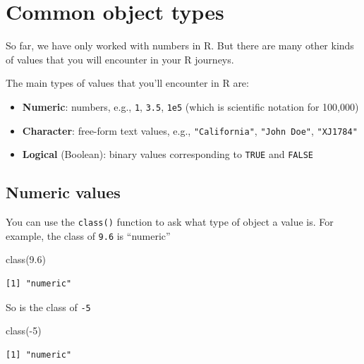 \documentclass[
  letterpaper,
  DIV=11,
  numbers=noendperiod]{scrreprt}
\newenvironment{Shaded}{\begin{snugshade}}{\end{snugshade}}
\newcommand{\DecValTok}[1]{\textcolor[rgb]{0.68,0.00,0.00}{#1}}
\newcommand{\FloatTok}[1]{\textcolor[rgb]{0.68,0.00,0.00}{#1}}
\newcommand{\FunctionTok}[1]{\textcolor[rgb]{0.28,0.35,0.67}{#1}}
\newcommand{\NormalTok}[1]{\textcolor[rgb]{0.00,0.23,0.31}{#1}}
\newcommand{\SpecialCharTok}[1]{\textcolor[rgb]{0.37,0.37,0.37}{#1}}
\begin{document}
\section{Common object types}\label{common-object-types}

So far, we have only worked with numbers in R. But there are many other
kinds of values that you will encounter in your R journeys.

The main types of values that you'll encounter in R are:

\begin{itemize}
\item
  \textbf{Numeric}: numbers, e.g., \texttt{1}, \texttt{3.5},
  \texttt{1e5} (which is scientific notation for 100,000)
\item
  \textbf{Character}: free-form text values, e.g.,
  \texttt{"California"}, \texttt{"John\ Doe"}, \texttt{"XJ1784"}
\item
  \textbf{Logical} (Boolean): binary values corresponding to
  \texttt{TRUE} and \texttt{FALSE}
\end{itemize}

\subsection{Numeric values}\label{numeric-values}

You can use the \texttt{class()} function to ask what type of object a
value is. For example, the class of \texttt{9.6} is ``numeric''

\begin{Shaded}
\begin{Highlighting}[]
\FunctionTok{class}\NormalTok{(}\FloatTok{9.6}\NormalTok{)}
\end{Highlighting}
\end{Shaded}

\begin{verbatim}
[1] "numeric"
\end{verbatim}

So is the class of \texttt{-5}

\begin{Shaded}
\begin{Highlighting}[]
\FunctionTok{class}\NormalTok{(}\SpecialCharTok{{-}}\DecValTok{5}\NormalTok{)}
\end{Highlighting}
\end{Shaded}

\begin{verbatim}
[1] "numeric"
\end{verbatim}
\end{document}
